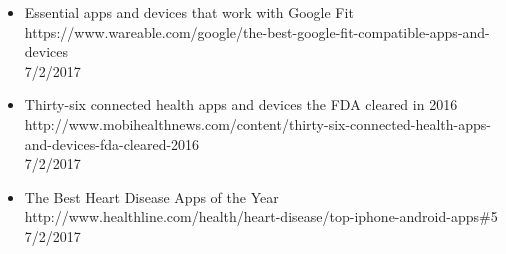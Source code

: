 \documentclass{article}
\begin{document}
\begin{itemize}
\item Essential apps and devices that work with Google Fit
\\ https://www.wareable.com/google/the-best-google-fit-compatible-apps-and-devices
\\ 7/2/2017

\item Thirty-six connected health apps and devices the FDA cleared in 2016
\\ http://www.mobihealthnews.com/content/thirty-six-connected-health-apps-and-devices-fda-cleared-2016
\\ 7/2/2017

\item The Best Heart Disease Apps of the Year
\\ http://www.healthline.com/health/heart-disease/top-iphone-android-apps\#5
\\ 7/2/2017
\end{itemize}
\end{document}
